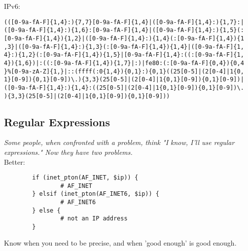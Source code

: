 \documentclass[xga]{xdvislides}
\begin{document}
IPv6:
\begin{verbatim}
(([0-9a-fA-F]{1,4}:){7,7}[0-9a-fA-F]{1,4}|([0-9a-fA-F]{1,4}:){1,7}:|
([0-9a-fA-F]{1,4}:){1,6}:[0-9a-fA-F]{1,4}|([0-9a-fA-F]{1,4}:){1,5}(:
[0-9a-fA-F]{1,4}){1,2}|([0-9a-fA-F]{1,4}:){1,4}(:[0-9a-fA-F]{1,4}){1
,3}|([0-9a-fA-F]{1,4}:){1,3}(:[0-9a-fA-F]{1,4}){1,4}|([0-9a-fA-F]{1,
4}:){1,2}(:[0-9a-fA-F]{1,4}){1,5}|[0-9a-fA-F]{1,4}:((:[0-9a-fA-F]{1,
4}){1,6})|:((:[0-9a-fA-F]{1,4}){1,7}|:)|fe80:(:[0-9a-fA-F]{0,4}){0,4
}%[0-9a-zA-Z]{1,}|::(ffff(:0{1,4}){0,1}:){0,1}((25[0-5]|(2[0-4]|1{0,
1}[0-9]){0,1}[0-9])\.){3,3}(25[0-5]|(2[0-4]|1{0,1}[0-9]){0,1}[0-9])|
([0-9a-fA-F]{1,4}:){1,4}:((25[0-5]|(2[0-4]|1{0,1}[0-9]){0,1}[0-9])\.
){3,3}(25[0-5]|(2[0-4]|1{0,1}[0-9]){0,1}[0-9]))
\end{verbatim}

\subsection{Regular Expressions}
{\em Some people, when confronted with a problem,
think "I know, I'll use regular expressions." Now they
have two problems.} \\

Better:
\begin{verbatim}
        if (inet_pton(AF_INET, $ip)) {
                # AF_INET
        } elsif (inet_pton(AF_INET6, $ip)) {
                # AF_INET6
        } else {
                # not an IP address
        }
\end{verbatim}

Know when you need to be precise, and when 'good
enough' is good enough.
\end{document}
